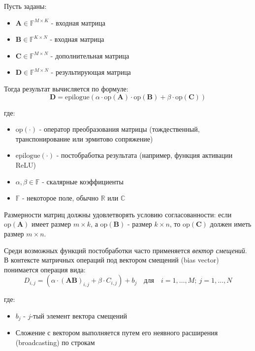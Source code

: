Пусть заданы:
\begin{itemize}
    \item $\mathbf{A} \in \mathbb{F}^{M \times K}$ - входная матрица
    \item $\mathbf{B} \in \mathbb{F}^{K \times N}$ - входная матрица
    \item $\mathbf{C} \in \mathbb{F}^{M \times N}$ - дополнительная матрица
    \item $\mathbf{D} \in \mathbb{F}^{M \times N}$ - результирующая матрица
\end{itemize}

Тогда результат вычисляется по формуле:
\begin{equation}
\mathbf{D} = \text{epilogue}\left(\alpha \cdot \text{op}(\mathbf{A}) \cdot \text{op}(\mathbf{B}) + \beta \cdot \text{op}(\mathbf{C})\right)
\end{equation}

где:
\begin{itemize}
    \item $\text{op}(\cdot)$ - оператор преобразования матрицы (тождественный, транспонирование или эрмитово сопряжение)
    \item $\text{epilogue}(\cdot)$ - постобработка результата (например, функция активации ReLU)
    \item $\alpha, \beta \in \mathbb{F}$ - скалярные коэффициенты
    \item $\mathbb{F}$ - некоторое поле, обычно $\mathbb{R}$ или $\mathbb{C}$
\end{itemize}

Размерности матриц должны удовлетворять условию согласованности: если $\text{op}(\mathbf{A})$ имеет размер
$m \times k$, а $\text{op}(\mathbf{B})$ - размер $k \times n$, то $\text{op}(\mathbf{C})$ должен иметь размер $m \times n$.

Среди возможных функций постобработки часто применяется \textit{вектор смещений}.
В контексте матричных операций под вектором смещений (bias vector) понимается операция вида:
\begin{equation}
D_{i,j} = \left(\alpha \cdot (\mathbf{A}\mathbf{B})_{i,j} + \beta \cdot C_{i,j}\right) + b_j \quad \text{для} \quad i=1,\ldots,M; \ j=1,\ldots,N
\end{equation}

где:
\begin{itemize}
    \item $b_j$ - $j$-тый элемент вектора смещений
    \item Сложение с вектором выполняется путем его неявного расширения (broadcasting) по строкам
\end{itemize}

